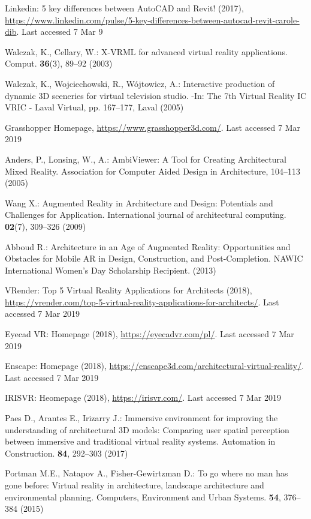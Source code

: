\documentclass[runningheads]{llncs}
\begin{document}
\begin{thebibliography}{8}
Linkedin: 5 key differences between AutoCAD and Revit! (2017), 
\url{https://www.linkedin.com/pulse/5-key-differences-between-autocad-revit-carole-dib}. Last accessed 7 Mar 9

Walczak, K., Cellary, W.: X-VRML for advanced virtual reality applications. Comput.
 \textbf{36}(3), 89--92 (2003)

Walczak, K., Wojciechowski, R., W\'{o}jtowicz, A.: Interactive production of dynamic
3D sceneries for virtual television studio. -In: The 7th Virtual Reality IC VRIC -
Laval Virtual, pp. 167--177, Laval (2005)

Grasshopper Homepage, \url{https://www.grasshopper3d.com/}. Last accessed 7 Mar 2019

Anders, P., Lonsing, W., A.: AmbiViewer: A Tool for Creating Architectural Mixed Reality. Association for Computer Aided Design in Architecture, 104--113 (2005)

Wang X.: Augmented Reality in Architecture and Design: Potentials and Challenges for Application. International journal of architectural computing. \textbf{02}(7), 309--326 (2009)

Abboud R.: Architecture in an Age of Augmented Reality:  
Opportunities and Obstacles for Mobile AR in Design, Construction, and Post-Completion.  NAWIC International Women’s Day Scholarship Recipient. (2013)

VRender: Top 5 Virtual Reality Applications for Architects (2018), \url{https://vrender.com/top-5-virtual-reality-applications-for-architects/}. 
Last accessed 7 Mar 2019

Eyecad VR: Homepage (2018), \url{https://eyecadvr.com/pl/}. Last accessed 7 Mar 2019

Enscape: Homepage (2018), \url{https://enscape3d.com/architectural-virtual-reality/}. Last accessed 7 Mar 2019

IRISVR: Heomepage (2018), \url{https://irisvr.com/}. Last accessed 7 Mar 2019

Paes D., Arantes E., Irizarry J.: Immersive environment for improving the understanding of architectural 3D models: Comparing user spatial perception between immersive and traditional virtual reality systems. Automation in Construction. \textbf{84}, 292--303 (2017)

Portman M.E., Natapov A., Fisher-Gewirtzman D.: To go where no man has gone before: Virtual reality in architecture, landscape architecture and environmental planning. Computers, Environment and Urban Systems. \textbf{54}, 376--384 (2015)


\end{thebibliography}
\end{document}
